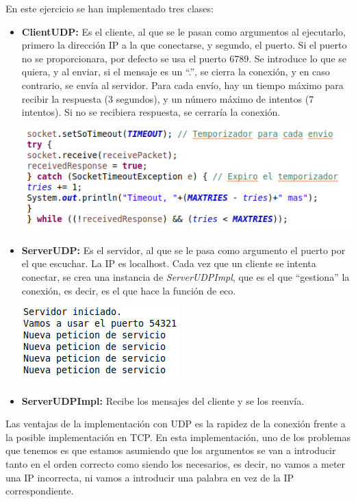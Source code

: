 \documentclass{article}
\begin{document}
En este ejercicio se han implementado tres clases:

\begin{itemize}
\item \textbf{ClientUDP:} Es el cliente, al que se le pasan como argumentos al ejecutarlo, primero la dirección IP a la que conectarse, y segundo, el puerto. Si el puerto no se proporcionara, por defecto se usa el puerto 6789. Se introduce lo que se quiera, y al enviar, si el mensaje es un “.”, se cierra la conexión, y en caso contrario, se envía al servidor. Para cada envío, hay un tiempo máximo para recibir la respuesta (3 segundos), y un número máximo de intentos (7 intentos). Si no se recibiera respuesta, se cerraría la conexión.
\begin{center}
\includegraphics[scale=0.4]{images/UDPClient.png}
\end{center}
\item \textbf{ServerUDP: } Es el servidor, al que se le pasa como argumento el puerto por el que escuchar. La IP es localhost. Cada vez que un cliente se intenta conectar, se crea una instancia de \textit{ServerUDPImpl}, que es el que “gestiona” la conexión, es decir, es el que hace la función de eco.
\begin{center}
\includegraphics[scale=0.4]{images/UDPServer.png}
\end{center}
\item \textbf{ServerUDPImpl:} Recibe los mensajes del cliente y se los reenvía.
\end{itemize}

Las ventajas de la implementación con UDP es la rapidez de la conexión frente a la posible implementación en TCP. En esta implementación, uno de los problemas que tenemos es que estamos asumiendo que los argumentos se van a introducir tanto en el orden correcto como siendo los necesarios, es decir, no vamos a meter una IP incorrecta, ni vamos a introducir una palabra en vez de la IP correspondiente.
\end{document}
